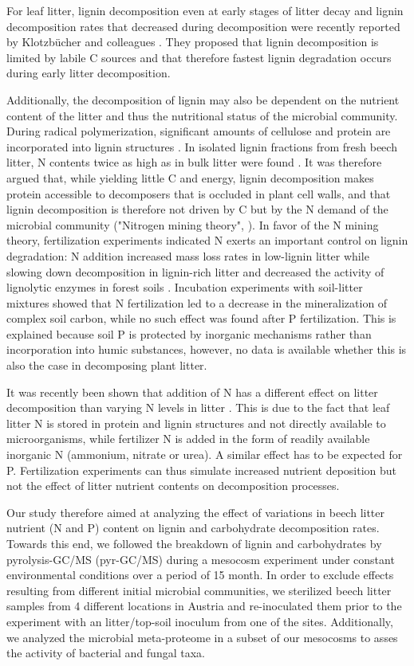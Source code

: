 For leaf litter, lignin decomposition even at early stages of litter decay and lignin decomposition rates that decreased during decomposition were recently reported by Klotzb\"{u}cher and colleagues \cite{Klotzbucher2011}. They proposed that lignin decomposition is limited by labile C sources and that therefore fastest lignin degradation occurs during early litter decomposition. 

Additionally, the decomposition of lignin may also be dependent on the nutrient content of the litter and thus the nutritional status of the microbial community. During radical polymerization, significant amounts of cellulose and protein are incorporated into lignin structures \cite{Achyuthan2010}. In isolated lignin fractions from fresh beech litter, N contents twice as high as in bulk litter were found \cite{Dyckmans2002}. It was therefore argued that, while yielding little C and energy, lignin decomposition makes protein accessible to decomposers that is occluded in plant cell walls, and that lignin decomposition is therefore not driven by C but by the N demand of the microbial community ("Nitrogen mining theory", \cite{Craine2007}). In favor of the N mining theory, fertilization experiments indicated N exerts an important control on lignin degradation: N addition increased mass loss rates in low-lignin litter while slowing down decomposition in lignin-rich litter \cite{Knorr2005} and decreased the activity of lignolytic enzymes in forest soils \cite{Sinsabaugh2010}. Incubation experiments with soil-litter mixtures
showed that N fertilization led to a decrease in the mineralization of complex soil carbon, while no such effect was found after P fertilization\cite{Craine2007}. This is explained because soil P is protected by inorganic mechanisms rather than incorporation into humic substances, however, no data is available whether this is also the case in decomposing plant litter.

It was recently been shown that addition of N has a different effect on litter decomposition than varying N levels in litter \cite{Talbot2011}. This is due to the fact that leaf litter N is stored in protein and lignin structures and not directly available to microorganisms, while fertilizer N is added in the form of readily available inorganic N (ammonium, nitrate or urea). A similar effect has to be expected for P. Fertilization experiments can thus simulate increased nutrient deposition but not the effect of litter nutrient contents on decomposition processes. 

Our study therefore aimed at analyzing the effect of variations in beech litter nutrient (N and P) content on lignin and carbohydrate decomposition rates. Towards this end, we followed the breakdown of lignin and carbohydrates by pyrolysis-GC/MS (pyr-GC/MS) during a mesocosm experiment under constant environmental conditions over a period of 15 month. In order to exclude effects resulting from different initial microbial communities, we sterilized beech litter samples from 4 different locations in Austria and re-inoculated them prior to the experiment with an litter/top-soil inoculum from one of the sites. Additionally, we analyzed the microbial meta-proteome in a subset of our mesocosms to asses the activity of bacterial and fungal taxa.

